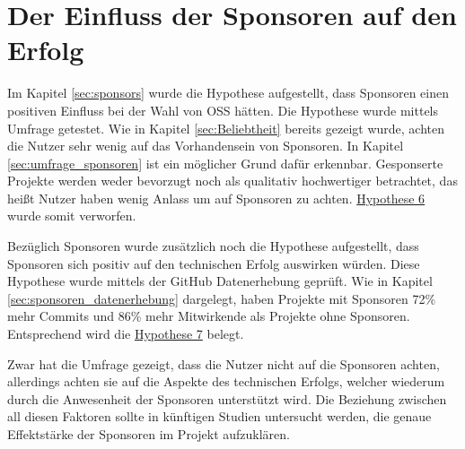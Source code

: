 






\section{Der Einfluss der Sponsoren auf den Erfolg}

Im Kapitel \ref{sec:sponsors} wurde die Hypothese aufgestellt, dass Sponsoren einen positiven Einfluss
bei der Wahl von OSS hätten.
Die Hypothese wurde mittels Umfrage getestet.
Wie in Kapitel \ref{sec:Beliebtheit} bereits gezeigt wurde, achten die Nutzer sehr wenig auf das
Vorhandensein von Sponsoren.
In Kapitel \ref{sec:umfrage_sponsoren} ist ein möglicher Grund dafür erkennbar.
Gesponserte Projekte werden weder bevorzugt noch als qualitativ
hochwertiger betrachtet, das heißt Nutzer haben wenig Anlass um auf Sponsoren zu achten.
\hyperref[H:6]{Hypothese 6} wurde somit verworfen.

\bigskip
\noindent
Bezüglich Sponsoren wurde zusätzlich noch die Hypothese aufgestellt, dass Sponsoren sich positiv auf
den technischen Erfolg auswirken würden.
Diese Hypothese wurde mittels der GitHub Datenerhebung geprüft.
Wie in Kapitel \ref{sec:sponsoren_datenerhebung} dargelegt, haben Projekte mit Sponsoren 72\% mehr
Commits und 86\% mehr Mitwirkende als Projekte ohne Sponsoren.
Entsprechend wird die \hyperref[H:7]{Hypothese 7} belegt.


Zwar hat die Umfrage gezeigt, dass die Nutzer nicht auf die Sponsoren achten, allerdings achten sie
auf die Aspekte des technischen Erfolgs, welcher wiederum durch die Anwesenheit der Sponsoren 
unterstützt wird. 
Die Beziehung zwischen all diesen Faktoren sollte in künftigen Studien untersucht werden, die genaue 
Effektstärke der Sponsoren im Projekt aufzuklären.



